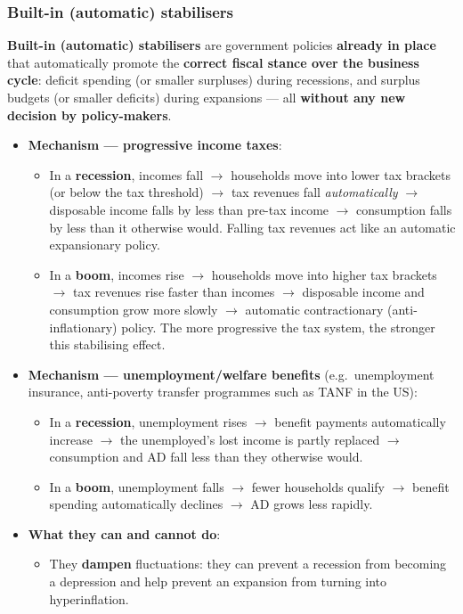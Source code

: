 \documentclass[a4paper,12pt]{article}
\newcommand{\needbold}[1]{\textcolor{red!70!black}{\textbf{#1}}}
\begin{document}
\subsubsection*{Built-in (automatic) stabilisers}
\needbold{Built-in (automatic) stabilisers} are government policies \textbf{already in place} that automatically promote the \textbf{correct fiscal stance over the business cycle}: deficit spending (or smaller surpluses) during recessions, and surplus budgets (or smaller deficits) during expansions --- all \textbf{without any new decision by policy-makers}.
\begin{itemize}
  \item \textbf{Mechanism --- progressive income taxes}:
  \begin{itemize}
    \item In a \textbf{recession}, incomes fall $\to$ households move into lower tax brackets (or below the tax threshold) $\to$ tax revenues fall \textit{automatically} $\to$ disposable income falls by less than pre-tax income $\to$ consumption falls by less than it otherwise would. Falling tax revenues act like an automatic expansionary policy.
    \item In a \textbf{boom}, incomes rise $\to$ households move into higher tax brackets $\to$ tax revenues rise faster than incomes $\to$ disposable income and consumption grow more slowly $\to$ automatic contractionary (anti-inflationary) policy. The more progressive the tax system, the stronger this stabilising effect.
  \end{itemize}
  \item \textbf{Mechanism --- unemployment/welfare benefits} (e.g.\ unemployment insurance, anti-poverty transfer programmes such as TANF in the US):
  \begin{itemize}
    \item In a \textbf{recession}, unemployment rises $\to$ benefit payments automatically increase $\to$ the unemployed's lost income is partly replaced $\to$ consumption and AD fall less than they otherwise would.
    \item In a \textbf{boom}, unemployment falls $\to$ fewer households qualify $\to$ benefit spending automatically declines $\to$ AD grows less rapidly.
  \end{itemize}
  \item \textbf{What they can and cannot do}:
  \begin{itemize}
    \item They \textbf{dampen} fluctuations: they can prevent a recession from becoming a depression and help prevent an expansion from turning into hyperinflation.

\end{itemize}
\end{itemize}
\end{document}
